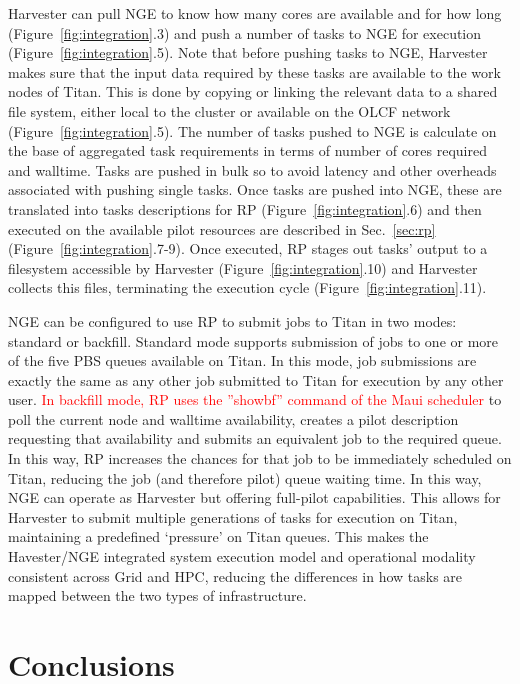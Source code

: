 \documentclass{webofc}
\begin{document}
Harvester can pull NGE to know how many cores are available and for how long
(Figure~\ref{fig:integration}.3) and push a number of tasks to NGE for
execution (Figure~\ref{fig:integration}.5). Note that before pushing tasks to
NGE, Harvester makes sure that the input data required by these tasks are
available to the work nodes of Titan. This is done by copying or linking the
relevant data to a shared file system, either local to the cluster or
available on the OLCF network (Figure~\ref{fig:integration}.5).  The number
of tasks pushed to NGE is calculate on the base of aggregated task
requirements in terms of number of cores required and walltime. Tasks are
pushed in bulk so to avoid latency and other overheads associated with
pushing single tasks. Once tasks are pushed into NGE, these are translated
into tasks descriptions for RP (Figure~\ref{fig:integration}.6) and then
executed on the available pilot resources are described in Sec.~\ref{sec:rp}
(Figure~\ref{fig:integration}.7-9). Once executed, RP stages out tasks’
output to a filesystem accessible by Harvester
(Figure~\ref{fig:integration}.10) and Harvester collects this files,
terminating the execution cycle (Figure~\ref{fig:integration}.11).

NGE can be configured to use RP to submit jobs to Titan in two modes:
standard or backfill. Standard mode supports submission of jobs to one or
more of the five PBS queues available on Titan. In this mode, job submissions
are exactly the same as any other job submitted to Titan for execution by any
other user. \textcolor{red}{In backfill mode, RP uses the ''showbf'' command of the Maui scheduler} to
poll the current node and walltime availability, creates a pilot description
requesting that availability and submits an equivalent job to the required
queue. In this way, RP increases the chances for that job to be immediately
scheduled on Titan, reducing the job (and therefore pilot) queue waiting
time. In this way, NGE can operate as Harvester but offering full-pilot
capabilities. This allows for Harvester to submit multiple generations of
tasks for execution on Titan, maintaining a predefined ‘pressure’ on Titan
queues. This makes the Havester/NGE integrated system execution model and
operational modality consistent across Grid and HPC, reducing the differences
in how tasks are mapped between the two types of infrastructure.


\section{Conclusions}
\end{document}
